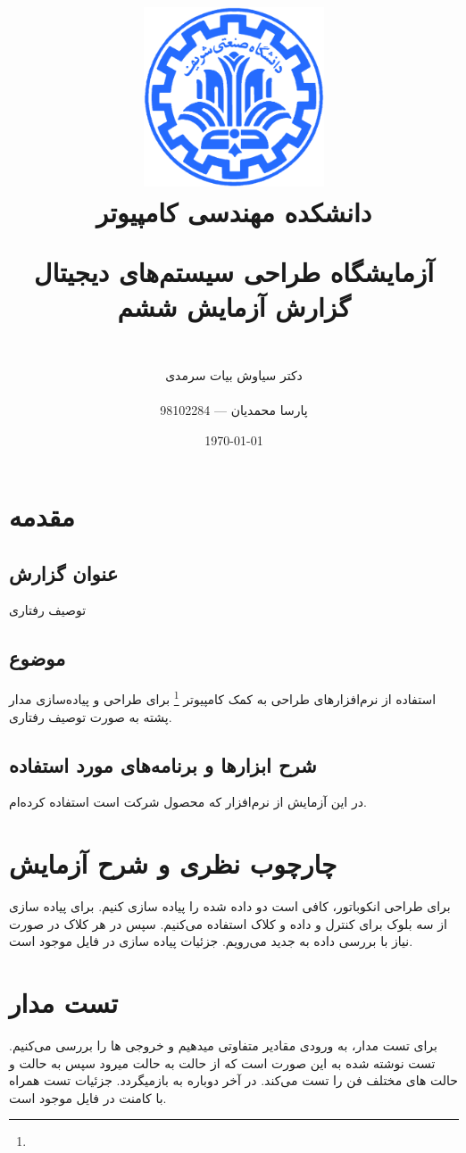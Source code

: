 \documentclass[fleqn]{article}
\title{
\includegraphics[width=0.4\textwidth]{sharif.png}\\
\normalsize{دانشکده مهندسی کامپیوتر}\\
\vspace{1cm}
	
\huge{آزمایشگاه طراحی سیستم‌های دیجیتال}
\\
\Large{گزارش آزمایش ششم}
\\
}
\author{
\\
دکتر سیاوش بیات سرمدی
\\
\\
پارسا محمدیان --- 98102284
}
\date{\today}
\begin{document}
\clearpage\maketitle
\thispagestyle{empty}

\newpage

\pagestyle{fancy}



\tableofcontents

\setcounter{page}{1}

\newpage

\section{مقدمه}

\subsection*{عنوان گزارش}
توصیف رفتاری
\subsection*{موضوع}
استفاده از نرم‌افزارهای طراحی به کمک کامپیوتر \footnote{} برای طراحی 
و پیاده‌سازی مدار پشته به صورت توصیف رفتاری.
\subsection*{شرح ابزارها و برنامه‌های مورد استفاده}
در این آزمایش از نرم‌افزار  که محصول شرکت  است 
استفاده کرده‌ام.

\section{چارچوب نظری و شرح آزمایش}
برای طراحی انکوباتور، کافی است دو 
داده شده را پیاده سازی کنیم. برای پیاده سازی از سه بلوک 
برای کنترل و داده و کلاک استفاده می‌کنیم.
سپس در هر کلاک در صورت نیاز با بررسی داده به 
جدید می‌رویم. جزئیات پیاده سازی در فایل
موجود است.

\section{تست مدار}
برای تست مدار، به ورودی مقادیر متفاوتی میدهیم و خروجی ها را بررسی می‌کنیم. تست نوشته شده به این صورت است که از 
حالت 
به حالت 
میرود سپس به حالت 
و حالت های مختلف فن را تست می‌کند.
در آخر دوباره به 
بازمیگردد.
جزئیات تست همراه با کامنت در فایل 
موجود است.
\end{document}
